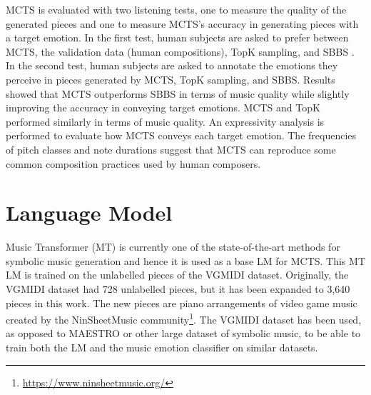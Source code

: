 MCTS is evaluated with two listening tests, one to measure the quality of the generated pieces and one to measure MCTS's accuracy in generating pieces with a target emotion. In the first test, human subjects are asked to prefer between MCTS, the validation data (human compositions), TopK sampling, and SBBS \cite{ferreira2020computer}. In the second test, human subjects are asked to annotate the emotions they perceive in pieces generated by MCTS, TopK sampling, and SBBS. Results showed that MCTS outperforms SBBS in terms of music quality while slightly improving the accuracy in conveying target emotions. MCTS and TopK performed similarly in terms of music quality. An expressivity analysis \cite{smith2010analyzing} is performed to evaluate how MCTS conveys each target emotion. The frequencies of pitch classes and note durations suggest that MCTS can reproduce some common composition practices used by human composers.



\section{Language Model}

Music Transformer (MT) \cite{huang2018music} is currently one of the state-of-the-art methods for symbolic music generation and hence it is used as a base LM for MCTS. This MT LM is trained on the unlabelled pieces of the VGMIDI dataset. Originally, the VGMIDI dataset had 728 unlabelled pieces, but it has been expanded to 3,640 pieces in this work. The new pieces are piano arrangements of video game music created by the NinSheetMusic community\footnote{\url{https://www.ninsheetmusic.org/}}. The VGMIDI dataset has been used, as opposed to MAESTRO \cite{hawthorne2018enabling} or other large dataset of symbolic music, to be able to train both the LM and the music emotion classifier on similar datasets.

